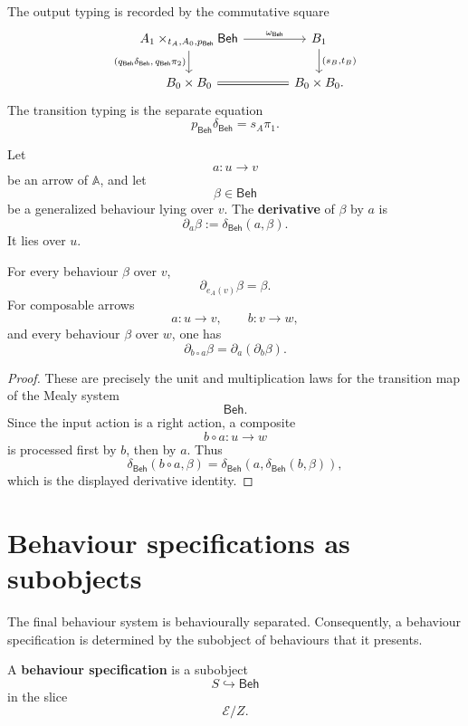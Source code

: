 The output typing is recorded by the commutative square
\[
\begin{tikzcd}[column sep=large]
A_1\times_{t_A,A_0,p_{\mathsf{Beh}}}\mathsf{Beh}
\arrow[r, "\omega_{\mathsf{Beh}}"]
\arrow[d, "{(q_{\mathsf{Beh}}\delta_{\mathsf{Beh}},\,q_{\mathsf{Beh}}\pi_2)}"']
&
B_1
\arrow[d, "{(s_B,t_B)}"]
\\
B_0\times B_0
\arrow[r, equal]
&
B_0\times B_0 .
\end{tikzcd}
\]
The transition typing is the separate equation
\[
p_{\mathsf{Beh}}\delta_{\mathsf{Beh}}=s_A\pi_1.
\]

\begin{definition}[Derivative]
\label{def:canonical-behaviour-derivative}
Let
\[
a:u\to v
\]
be an arrow of \(\mathbb A\), and let
\[
\beta\in\mathsf{Beh}
\]
be a generalized behaviour lying over \(v\). The \textbf{derivative} of
\(\beta\) by \(a\) is
\[
\partial_a\beta
:=
\delta_{\mathsf{Beh}}(a,\beta).
\]
It lies over \(u\).
\end{definition}

\begin{proposition}
\label{prop:canonical-derivative-laws}
For every behaviour \(\beta\) over \(v\),
\[
\partial_{e_A(v)}\beta=\beta.
\]
For composable arrows
\[
a:u\to v,
\qquad
b:v\to w,
\]
and every behaviour \(\beta\) over \(w\), one has
\[
\partial_{b\circ a}\beta
=
\partial_a(\partial_b\beta).
\]
\end{proposition}

\begin{proof}
These are precisely the unit and multiplication laws for the transition map
of the Mealy system
\[
\mathsf{Beh}.
\]
Since the input action is a right action, a composite
\[
b\circ a:u\to w
\]
is processed first by \(b\), then by \(a\). Thus
\[
\delta_{\mathsf{Beh}}(b\circ a,\beta)
=
\delta_{\mathsf{Beh}}(a,\delta_{\mathsf{Beh}}(b,\beta)),
\]
which is the displayed derivative identity.
\end{proof}

\section{Behaviour specifications as subobjects}
\label{sec:behaviour-specifications-subobjects}

The final behaviour system is behaviourally separated. Consequently, a
behaviour specification is determined by the subobject of behaviours that it
presents.

\begin{definition}
\label{def:behaviour-specification-subobject}
A \textbf{behaviour specification} is a subobject
\[
S\hookrightarrow \mathsf{Beh}
\]
in the slice
\[
\mathcal E/Z.
\]
\end{definition}

